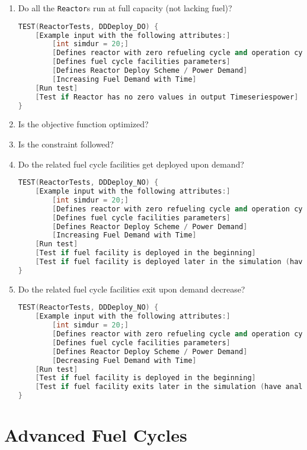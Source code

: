 \documentclass[12pt,letterpaper]{article}
\begin{document}
\begin{enumerate}
\item  Do all the \texttt{Reactor}s run at full capacity (not lacking fuel)? 
\begin{lstlisting}[language=C++, caption=Test to see all reactors run without lack of fuel]
TEST(ReactorTests, DDDeploy_DO) {
    [Example input with the following attributes:]
        [int simdur = 20;]
        [Defines reactor with zero refueling cycle and operation cycle of 1 month]
        [Defines fuel cycle facilities parameters]
        [Defines Reactor Deploy Scheme / Power Demand]
        [Increasing Fuel Demand with Time]
    [Run test]
    [Test if Reactor has no zero values in output Timeseriespower]
}
\end{lstlisting}

\item Is the objective function optimized?

\item Is the constraint followed? 

\item  Do the related fuel cycle facilities get deployed upon demand?
\begin{lstlisting}[language=C++, caption=Test demand-driven deployment of fuel cycle facility]
TEST(ReactorTests, DDDeploy_NO) {
    [Example input with the following attributes:]
        [int simdur = 20;]
        [Defines reactor with zero refueling cycle and operation cycle of 1 month]
        [Defines fuel cycle facilities parameters]
        [Defines Reactor Deploy Scheme / Power Demand]
        [Increasing Fuel Demand with Time]
    [Run test]
    [Test if fuel facility is deployed in the beginning]
    [Test if fuel facility is deployed later in the simulation (have analytic solution)]
}
\end{lstlisting}

\item Do the related fuel cycle facilities exit upon demand decrease?
\begin{lstlisting}[language=C++, caption=Test demand-driven exit of fuel cycle facility]
TEST(ReactorTests, DDDeploy_NO) {
    [Example input with the following attributes:]
        [int simdur = 20;]
        [Defines reactor with zero refueling cycle and operation cycle of 1 month]
        [Defines fuel cycle facilities parameters]
        [Defines Reactor Deploy Scheme / Power Demand]
        [Decreasing Fuel Demand with Time]
    [Run test]
    [Test if fuel facility is deployed in the beginning]
    [Test if fuel facility exits later in the simulation (have analytic solution)]
}
\end{lstlisting}


\end{enumerate}





\section{Advanced Fuel Cycles}
\end{document}
